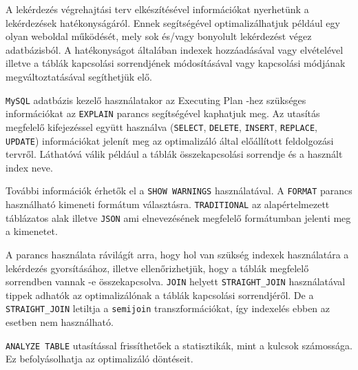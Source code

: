 

A lekérdezés végrehajtási terv elkészítésével információkat nyerhetünk a lekérdezések hatékonyságáról. Ennek segítségével optimalizálhatjuk például egy olyan weboldal működését, mely sok és/vagy bonyolult lekérdezést végez adatbázisból. A hatékonyságot általában indexek hozzáadásával vagy elvételével illetve a táblák kapcsolási sorrendjének módosításával vagy kapcsolási módjának megváltoztatásával segíthetjük elő.


\texttt{MySQL} adatbázis kezelő használatakor az Executing Plan -hez szükséges információkat az \texttt{EXPLAIN} parancs segítségével kaphatjuk meg.
Az utasítás megfelelő kifejezéssel együtt használva (\texttt{SELECT}, \texttt{DELETE}, \texttt{INSERT}, \texttt{REPLACE}, \texttt{UPDATE})  információkat jelenít meg az optimalizáló által előállított feldolgozási tervről. Láthatóvá válik például a táblák összekapcsolási sorrendje és a használt index neve.

További információk érhetők el a \texttt{SHOW WARNINGS} használatával.
A \texttt{FORMAT} parancs használható kimeneti formátum választásra. \texttt{TRADITIONAL} az alapértelmezett táblázatos alak illetve \texttt{JSON} ami elnevezésének megfelelő formátumban jelenti meg a kimenetet.

A parancs használata rávilágít arra, hogy hol van szükség indexek használatára a lekérdezés gyorsításához, illetve ellenőrizhetjük, hogy a táblák megfelelő sorrendben vannak -e összekapcsolva. 
\texttt{JOIN} helyett \texttt{STRAIGHT\_JOIN} használatával tippek adhatók az optimalizálónak a táblák kapcsolási sorrendjéről. De a \texttt{STRAIGHT\_JOIN} letiltja a \texttt{semijoin} transzformációkat, így indexelés ebben az esetben nem használható.

\texttt{ANALYZE TABLE} utasítással frissíthetőek a statisztikák, mint a kulcsok számossága. Ez befolyásolhatja az optimalizáló döntéseit. 


